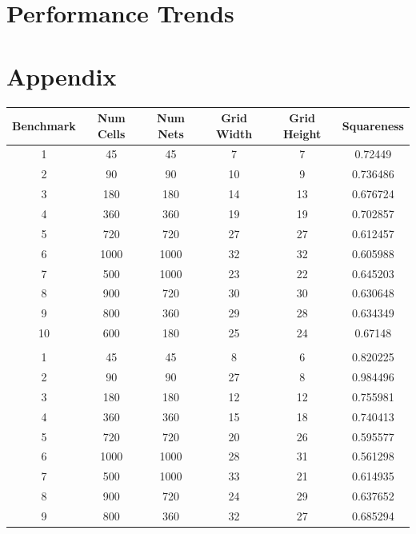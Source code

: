 \documentclass[10pt]{article}
\begin{document}
\newpage
\section{Performance Trends}

\newpage
\section{Appendix}

\begin{table}[H]
    \centering
    \begin{tabular}{cccccc}
        \toprule
        \textbf{Benchmark} & \textbf{Num Cells} & \textbf{Num Nets} & \textbf{Grid Width} & \textbf{Grid Height} & \textbf{Squareness}\\
        \midrule

        1  & 45   & 45   & 7  & 7  & 0.72449 \\
        2  & 90   & 90   & 10 & 9  & 0.736486 \\
        3  & 180  & 180  & 14 & 13 & 0.676724 \\
        4  & 360  & 360  & 19 & 19 & 0.702857 \\
        5  & 720  & 720  & 27 & 27 & 0.612457 \\
        6  & 1000 & 1000 & 32 & 32 & 0.605988 \\
        7  & 500  & 1000 & 23 & 22 & 0.645203 \\
        8  & 900  & 720  & 30 & 30 & 0.630648 \\
        9  & 800  & 360  & 29 & 28 & 0.634349 \\
        10 & 600  & 180  & 25 & 24 & 0.67148 \\
           &      &      &    &    & \\
        1  & 45   & 45   & 8  & 6  & 0.820225 \\
        2  & 90   & 90   & 27 & 8  & 0.984496 \\
        3  & 180  & 180  & 12 & 12 & 0.755981 \\
        4  & 360  & 360  & 15 & 18 & 0.740413 \\
        5  & 720  & 720  & 20 & 26 & 0.595577 \\
        6  & 1000 & 1000 & 28 & 31 & 0.561298 \\
        7  & 500  & 1000 & 33 & 21 & 0.614935 \\
        8  & 900  & 720  & 24 & 29 & 0.637652 \\
        9  & 800  & 360  & 32 & 27 & 0.685294 \\

\end{tabular}
\end{table}
\end{document}
